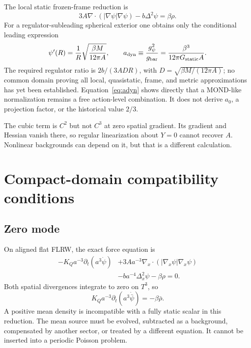 \documentclass[aps,prd,reprint,superscriptaddress,nofootinbib,floatfix]{revtex4-2}
\newcommand{\Tthree}{T^{3}}
\begin{document}
The local static frozen-frame reduction is
\begin{equation}
 3A\nabla\!\cdot\!\left(|\nabla\psi|\nabla\psi\right)
 -b\Delta^2\psi=\beta\rho.
 \label{eq:static-force}
\end{equation}
For a regulator-subleading spherical exterior one obtains only the conditional
leading expression
\begin{equation}
 \psi'(R)=\frac{1}{R}\sqrt{\frac{\beta M}{12\pi A}},
 \qquad
 a_{\rm dyn}\equiv\frac{g_\psi^2}{g_{\rm bar}}
 =\frac{\beta^3}{12\pi G_{\rm static}A}.
 \label{eq:adyn}
\end{equation}
The required regulator ratio is \(2b/(3ADR)\), with
\(D=\sqrt{\beta M/(12\pi A)}\); no common domain proving all local,
quasistatic, frame, and metric approximations has yet been established.
Equation~\eqref{eq:adyn} shows directly that a MOND-like normalization remains
a free action-level combination.  It does not derive \(a_0\), a projection
factor, or the historical value \(2/3\).

The cubic term is \(C^2\) but not \(C^3\) at zero spatial gradient.  Its
gradient and Hessian vanish there, so regular linearization about \(Y=0\)
cannot recover \(A\).  Nonlinear backgrounds can depend on it, but that is a
different calculation.

\section{Compact-domain compatibility conditions}
\label{sec:compact}

\subsection{Zero mode}

On aligned flat FLRW, the exact force equation is
\begin{align}
 -K_Qa^{-3}\partial_t(a^3\dot\psi)
 &+3Aa^{-3}\nabla_x\!\cdot
 (|\nabla_x\psi|\nabla_x\psi)\nonumber\\
 &-ba^{-4}\Delta_x^2\psi-\beta\rho=0.
 \label{eq:periodic-full}
\end{align}
Both spatial divergences integrate to zero on \(\Tthree\), so
\begin{equation}
 K_Qa^{-3}\partial_t(a^3\dot{\bar\psi})=-\beta\bar\rho .
 \label{eq:zero-mode}
\end{equation}
A positive mean density is incompatible with a fully static scalar in this
reduction.  The mean source must be evolved, subtracted as a background,
compensated by another sector, or treated by a different equation.  It cannot
be inserted into a periodic Poisson problem.
\end{document}
